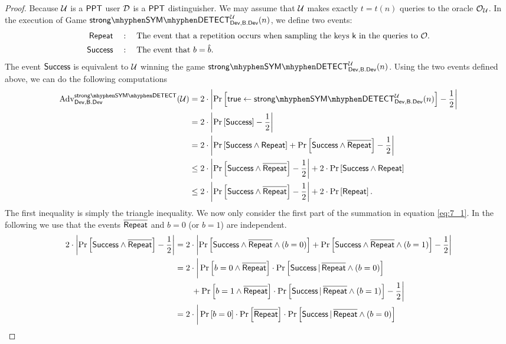 \begin{proof}
Because $\mathcal{U}$ is a $\mathsf{PPT}$ user $\operatorname{\mathcal{D}}$ is a $\mathsf{PPT}$ distinguisher. We may assume that $\mathcal{U}$ makes exactly $t=t(n)$ queries to the oracle $\operatorname{\mathcal{O}}_{\mathcal{U}}$. In the execution of Game $\symstrongdetect{\dev}{\bbdev}{\user}$, we define two events:
\begin{align*}
	\mathsf{Repeat}\quad &: \quad \mbox{The event that a repetition occurs when sampling the keys $\mathsf{k}$ in the queries to $\operatorname{\mathcal{O}}$.} \\
	\mathsf{Success}\quad &: \quad \mbox{The event that $b = \hat{b}$.} 
\end{align*}
The event $\mathsf{Success}$ is equivalent to $\mathcal{U}$ winning the game $\symstrongdetect{\dev}{\bbdev}{\user}$. Using the two events defined above, we can do the following computations
\begin{align}
	\adv_{\dev,\bbdev}^{\symstrongdetectplain}(\user) &= 2\cdot\left\vert \prob{\true\leftarrow\symstrongdetect{\dev}{\bbdev}{\user}} - \frac{1}{2}\right\vert \nonumber \\
	& = 2\cdot\left\vert \prob{\success} - \frac{1}{2}\right\vert \nonumber\\
	& = 2\cdot \left\vert \prob{\success\pand \rep}+\prob{\success\pand \pneg{\rep}} - \frac{1}{2} \right\vert \nonumber\\
	& \leq 2\cdot \left\vert \prob{\success\pand \pneg{\rep}} - \frac{1}{2}\right\vert + 2\cdot\prob{\success\pand \rep} \nonumber\\
\label{eq:7_1}	& \leq 2\cdot \left\vert \prob{\success\pand \pneg{\rep}} - \frac{1}{2}\right\vert + 2\cdot\prob{\rep}.
\end{align}
The first inequality is simply the triangle inequality. We now only consider the first part of the summation in equation \ref{eq:7_1}. In the following we use that the events $\overline{\mathstrut\mathsf{Repeat}}$ and $b = 0$ (or $b = 1$) are independent.
\begin{align}
	2\cdot \left\vert \prob{\success\pand \pneg{\rep}} - \frac{1}{2}\right\vert & = 2\cdot\left\vert \prob{\success\pand \pneg{\rep}\pand(b=0)} + \prob{\success\pand\pneg{\rep}\pand(b=1)} - \frac{1}{2}\right\vert \nonumber \\
	& = 2\cdot\bigg\vert \prob{b=0\pand\pneg{\rep}}\cdot \condprob{\success}{\pneg{\rep}\pand(b=0)} \nonumber \\
	& \qquad + \prob{b=1\pand\pneg{\rep}}\cdot \condprob{\success}{\pneg{\rep}\pand(b=1)} - \frac{1}{2} \bigg\vert \nonumber \\
	& = 2\cdot\bigg\vert \prob{b=0}\cdot\prob{\pneg{\rep}}\cdot \condprob{\success}{\pneg{\rep}\pand(b=0)} \nonumber \\

\end{align}
\end{proof}
